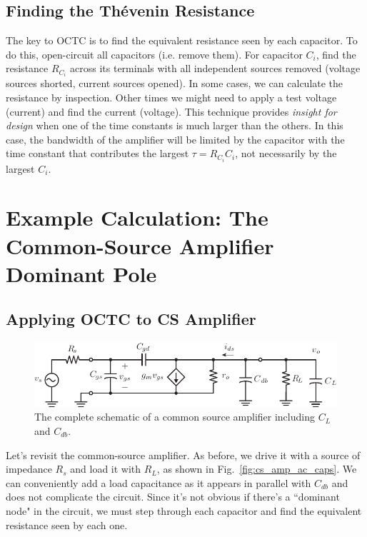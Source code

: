 \subsection{Finding the Thévenin Resistance}
The key to OCTC is to find the equivalent resistance seen by each capacitor.  To do this, open-circuit all capacitors (i.e. remove them).  For capacitor $C_i$, find the resistance $R_{C_i}$ across its terminals with all independent sources removed (voltage sources shorted, current sources opened).  In some cases, we can calculate the resistance by inspection. Other times we might need to apply a test voltage (current) and find the current (voltage).  This technique provides \textit{insight for design} when one of the time constants is much larger than the others.  In this case, the bandwidth of the amplifier will be limited by the capacitor with the time constant that contributes the largest $\tau = R_{C_i} C_i$, not necessarily by the largest $C_i$.
\section{Example Calculation:  The Common-Source Amplifier Dominant Pole}
\subsection{Applying OCTC to CS Amplifier}
\begin{figure}[tb]
\centering
\includegraphics[scale=1]{cs_amp_ac_caps}
\caption{The complete schematic of a common source amplifier including $C_L$ and $C_{db}$.} \label{fig:cs_amp_ac_caps2}
\end{figure}
Let's revisit the common-source amplifier.  As before, we drive it with a source of impedance $R_s$ and load it with $R_L$, as shown in Fig.~\ref{fig:cs_amp_ac_caps}.  We can conveniently add a load capacitance as it appears in parallel with $C_{db}$ and does not complicate the circuit. Since it's not obvious if there's a ``dominant node" in the circuit, we must step through each capacitor and find the equivalent resistance seen by each one. 
